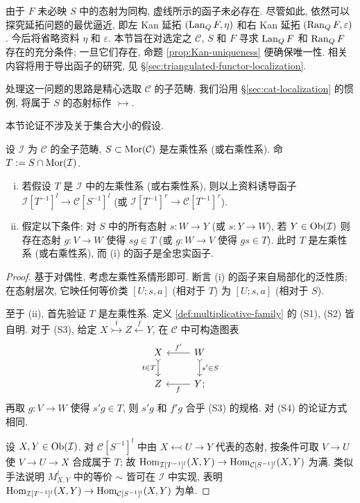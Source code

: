 由于 $F$ 未必映 $S$ 中的态射为同构, 虚线所示的函子未必存在. 尽管如此, 依然可以探究延拓问题的最优逼近, 即左 Kan 延拓 $(\operatorname{Lan}_Q F, \eta)$ 和右 Kan 延拓 $(\operatorname{Ran}_Q F, \varepsilon)$. 今后将省略资料 $\eta$ 和 $\varepsilon$. 本节旨在对选定之 $\mathcal{C}$, $S$ 和 $F$ 寻求 $\operatorname{Lan}_Q F$ 和 $\operatorname{Ran}_Q F$ 存在的充分条件; 一旦它们存在, 命题 \ref{prop:Kan-uniqueness} 便确保唯一性. 相关内容将用于导出函子的研究, 见 \S\ref{sec:triangulated-functor-localization}.

处理这一问题的思路是精心选取 $\mathcal{C}$ 的子范畴. 我们沿用 \S\ref{sec:cat-localization} 的惯例, 将属于 $S$ 的态射标作 $\rightarrowtail$.

本节论证不涉及关于集合大小的假设.

\begin{proposition}\label{prop:subcat-localization}
	设 $\mathcal{I}$ 为 $\mathcal{C}$ 的全子范畴, $S \subset \operatorname{Mor}(\mathcal{C})$ 是左乘性系 (或右乘性系). 命 $T := S \cap \operatorname{Mor}(\mathcal{I})$.
	\begin{enumerate}[(i)]
		\item 若假设 $T$ 是 $\mathcal{I}$ 中的左乘性系 (或右乘性系), 则以上资料诱导函子 $\mathcal{I}[T^{-1}]^l \to \mathcal{C}[S^{-1}]^l$ (或 $\mathcal{I}[T^{-1}]^r \to \mathcal{C}[T^{-1}]^r$).
		\item 假定以下条件: 对 $S$ 中的所有态射 $s: W \to Y$ (或 $s: Y \to W$), 若 $Y \in \operatorname{Ob}(\mathcal{I})$ 则存在态射 $g: V \to W$ 使得 $sg \in T$ (或 $g: W \to V$ 使得 $gs \in T$). 此时 $T$ 是左乘性系 (或右乘性系), 而 (i) 的函子是全忠实函子.
	\end{enumerate}
\end{proposition}
\begin{proof}
	基于对偶性, 考虑左乘性系情形即可. 断言 (i) 的函子来自局部化的泛性质; 在态射层次, 它映任何等价类 $[U; s, a]$ (相对于 $T$) 为 $[U; s, a]$ (相对于 $S$).
	
	至于 (ii), 首先验证 $T$ 是左乘性系. 定义 \ref{def:multiplicative-family} 的 (S1), (S2) 皆自明. 对于 (S3), 给定 $X \stackrel{t}{\rightarrowtail} Z \stackrel{f}{\leftarrow} Y$, 在 $\mathcal{C}$ 中可构造图表
	\[\begin{tikzcd}
		X \arrow[rightarrowtail, d, "{t \in T}"'] & W \arrow[l, "{f'}"'] \arrow[rightarrowtail, d, "{s' \in S}"] \\
		Z & Y \arrow[l, "f"] ;
	\end{tikzcd}\]
	再取 $g: V \to W$ 使得 $s' g \in T$, 则 $s'g$ 和 $f'g$ 合乎 (S3) 的规格. 对 (S4) 的论证方式相同.

	设 $X, Y \in \operatorname{Ob}(\mathcal{I})$. 对 $\mathcal{C}[S^{-1}]^l$ 中由 $X \leftarrowtail U \to Y$ 代表的态射, 按条件可取 $V \to U$ 使 $V \to U \to X$ 合成属于 $T$; 故 $\operatorname{Hom}_{\mathcal{I}[T^{-1}]^l}(X, Y) \to \operatorname{Hom}_{\mathcal{C}[S^{-1}]^l}(X, Y)$ 为满. 类似手法说明 $M_{X, Y}^l$ 中的等价 $\sim$ 皆可在 $\mathcal{I}$ 中实现, 表明 $\operatorname{Hom}_{\mathcal{I}[T^{-1}]^l}(X, Y) \to \operatorname{Hom}_{\mathcal{C}[S^{-1}]^l}(X, Y)$ 为单.
\end{proof}

